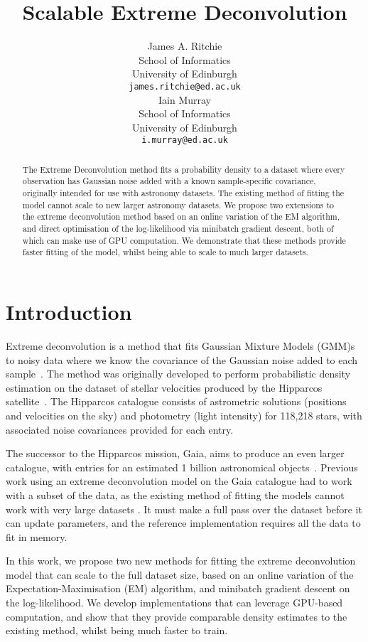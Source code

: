 \documentclass{article}
\title{Scalable Extreme Deconvolution}
\author{
  James A. Ritchie\\
  School of Informatics\\
  University of Edinburgh\\
   \texttt{james.ritchie@ed.ac.uk} \\
  \And
  Iain Murray\\
  School of Informatics\\
  University of Edinburgh\\
   \texttt{i.murray@ed.ac.uk} \\
}
\begin{document}
\maketitle

\begin{abstract}

The Extreme Deconvolution method fits a probability density to a dataset where every observation has Gaussian noise added with a known sample-specific covariance, originally intended for use with astronomy datasets.
The existing method of fitting the model cannot scale to new larger astronomy datasets.
We propose two extensions to the extreme deconvolution method based on an online variation of the EM algorithm, and direct optimisation of the log-likelihood via minibatch gradient descent, both of which can make use of GPU computation.
We demonstrate that these methods provide faster fitting of the model, whilst being able to scale to much larger datasets.

\end{abstract}

\section{Introduction}

Extreme deconvolution is a method that fits Gaussian Mixture Models (GMM)s to noisy data where we know the covariance of the Gaussian noise added to each sample~\cite{bovyExtremeDeconvolutionInferring2011}.
The method was originally developed to perform probabilistic density estimation on the dataset of stellar velocities produced by the Hipparcos satellite~\cite{perrymanHipparcosCatalogue1997}.
The Hipparcos catalogue consists of astrometric solutions (positions and velocities on the sky) and photometry (light intensity) for 118,218 stars, with associated noise covariances provided for each entry.

The successor to the Hipparcos mission, Gaia, aims to produce an even larger catalogue, with entries for an estimated 1 billion astronomical objects~\cite{collaborationGaiaMission2016}.
Previous work using an extreme deconvolution model on the Gaia catalogue had to work with a subset of the data, as the existing method of fitting the models cannot work with very large datasets \cite{andersonImprovingGaiaParallax2018}.
It must make a full pass over the dataset before it can update parameters, and the reference implementation requires all the data to fit in memory.

In this work, we propose two new methods for fitting the extreme deconvolution model that can scale to the full dataset size, based on an online variation of the Expectation-Maximisation (EM) algorithm, and minibatch gradient descent on the log-likelihood.
We develop implementations that can leverage GPU-based computation, and show that they provide comparable density estimates to the existing method, whilst being much faster to train.
\end{document}
